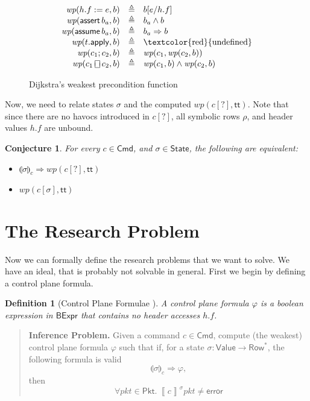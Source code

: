 \documentclass{article}
\newcommand{\pkt}{\mathit{pkt}}
\newcommand{\error}{\mathsf{error}}
\newcommand{\denote}[1]{\left\llbracket#1\right\rrbracket}
\newcommand{\TRUE}{\mathsf{tt}}
\newcommand{\Value}{\mathsf{Value}}
\newcommand{\BExpr}{\mathsf{BExpr}}
\newcommand{\Cmd}{\mathsf{Cmd}}
\newcommand{\Pkt}{\mathsf{Pkt}}
\newcommand{\Row}{\mathsf{Row}}
\newcommand{\State}{\mathsf{State}}
\newcommand{\assert}{\mathop{\mathsf{assert}}}
\newcommand{\assume}{\mathop{\mathsf{assume}}}
\newcommand{\apply}{\mathsf{apply}}
\newcommand{\choiceop}{\rotatebox[origin=c]{90}{$\sqsubset\!\!\!\sqsupset$}}
\newcommand{\choice}{\mathbin{\choiceop}}
\newcommand{\havoc}[1]{\mathop{\textsf{havoc}}#1}
\newcommand{\WP}{\textit{wp}}
\newcommand{\state}[1]{\llparenthesis#1\rrparenthesis}
\newcommand{\instr}{[?]}
\newtheorem{conjecture}{Conjecture}
\newtheorem{definition}{Definition}
\begin{document}
\begin{figure}[H]
  \[
  \begin{array}{r >{\triangleq}c l}
    \WP(h.f := e, b)
    && b[e/h.f] \\
    \WP(\assert b_a, b)
    && b_a \wedge b \\
    \WP(\assume b_a, b)
    && b_a \Rightarrow b \\
    \WP(t.\apply,b) && \textrm{\textcolor{red}{undefined}} \\
    \WP(c_1;c_2, b)
    && \WP(c_1,\WP(c_2,b)) \\
    \WP(c_1 \choice c_2, b)
    && \WP(c_1,b) \wedge \WP(c_2,b)
  \end{array}
  \]
  \caption{Dijkstra's weakest precondition function}
  \label{fig:wp}
\end{figure}

Now, we need to relate states $\sigma$ and the computed $\WP(c\instr,\TRUE)$.
Note that since there are no havocs introduced in $c\instr$, all symbolic rows
$\rho$, and header values $h.f$ are unbound.

\begin{conjecture}
  For every $c \in \Cmd$, and $\sigma \in \State$, the following are equivalent:
  \begin{itemize}
  \item \(\state\sigma_c \Rightarrow  \WP(c\instr,\TRUE)\)
  \item \(\WP(c[\sigma], \TRUE)\)
  \end{itemize}
\end{conjecture}



\clearpage
\section{The Research Problem}

Now we can formally define the research problems that we want to solve. We have
an ideal, that is probably not solvable in general. First we begin by defining a control plane formula.

\begin{definition}[Control Plane Formulae ]
  A control plane formula $\varphi$ is a boolean expression in $\BExpr$ that
  contains no header accesses $h.f$.
\end{definition}

\begin{quote}
  \textbf{Inference Problem.} Given a command $c \in \Cmd$, compute (the
  weakest) control plane formula $\varphi$ such that if, for a state $\sigma :
  \Value \to \Row^*$, the following formula is valid \[\state\sigma_c
  \Rightarrow \varphi,\] then \[\forall \pkt \in \Pkt.~ \denote{c}^\sigma\pkt \neq \error \]
\end{quote}
\end{document}

